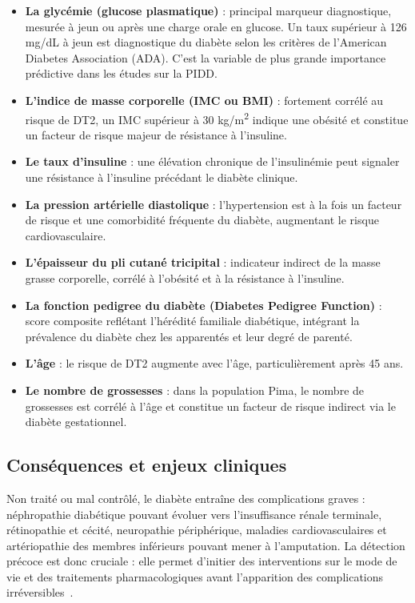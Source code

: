 \begin{itemize}
	\item \textbf{La glycémie (glucose plasmatique)} : principal marqueur diagnostique, mesurée
	à jeun ou après une charge orale en glucose. Un taux supérieur à 126 mg/dL à jeun est
	diagnostique du diabète selon les critères de l'American Diabetes Association (ADA). C'est
	la variable de plus grande importance prédictive dans les études sur la PIDD.
	
	\item \textbf{L'indice de masse corporelle (IMC ou BMI)} : fortement corrélé au risque de DT2,
	un IMC supérieur à 30 kg/m\textsuperscript{2} indique une obésité et constitue un facteur
	de risque majeur de résistance à l'insuline.
	
	\item \textbf{Le taux d'insuline} : une élévation chronique de l'insulinémie peut signaler
	une résistance à l'insuline précédant le diabète clinique.
	
	\item \textbf{La pression artérielle diastolique} : l'hypertension est à la fois un facteur
	de risque et une comorbidité fréquente du diabète, augmentant le risque cardiovasculaire.
	
	\item \textbf{L'épaisseur du pli cutané tricipital} : indicateur indirect de la masse grasse
	corporelle, corrélé à l'obésité et à la résistance à l'insuline.
	
	\item \textbf{La fonction pedigree du diabète (Diabetes Pedigree Function)} : score composite
	reflétant l'hérédité familiale diabétique, intégrant la prévalence du diabète chez les
	apparentés et leur degré de parenté.
	
	\item \textbf{L'âge} : le risque de DT2 augmente avec l'âge, particulièrement après 45 ans.
	
	\item \textbf{Le nombre de grossesses} : dans la population Pima, le nombre de grossesses est
	corrélé à l'âge et constitue un facteur de risque indirect via le diabète gestationnel.
\end{itemize}

\subsection*{Conséquences et enjeux cliniques}

Non traité ou mal contrôlé, le diabète entraîne des complications graves : néphropathie
diabétique pouvant évoluer vers l'insuffisance rénale terminale, rétinopathie et cécité,
neuropathie périphérique, maladies cardiovasculaires et artériopathie des membres inférieurs
pouvant mener à l'amputation. La détection précoce est donc cruciale : elle permet d'initier
des interventions sur le mode de vie et des traitements pharmacologiques avant l'apparition
des complications irréversibles~\citep{wee2024, khanam2021}.

